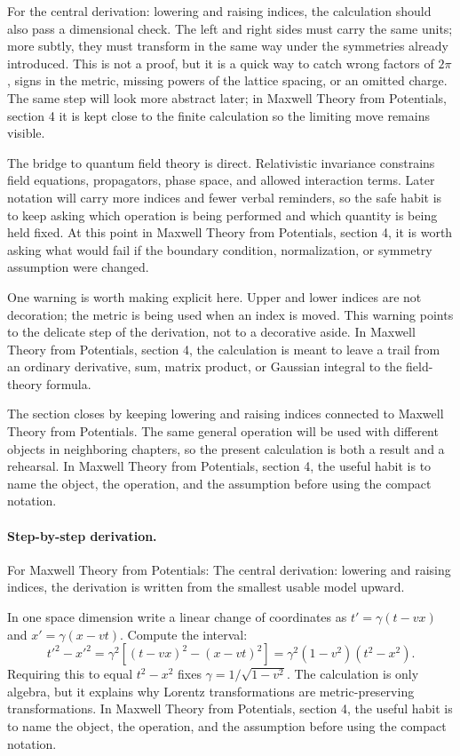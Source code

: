 For the central derivation: lowering and raising indices, the calculation should also pass a dimensional check.  The left and right sides must carry the same units; more subtly, they must transform in the same way under the symmetries already introduced.  This is not a proof, but it is a quick way to catch wrong factors of \(2\pi\), signs in the metric, missing powers of the lattice spacing, or an omitted charge.  The same step will look more abstract later; in Maxwell Theory from Potentials, section 4 it is kept close to the finite calculation so the limiting move remains visible.

The bridge to quantum field theory is direct.  Relativistic invariance constrains field equations, propagators, phase space, and allowed interaction terms.  Later notation will carry more indices and fewer verbal reminders, so the safe habit is to keep asking which operation is being performed and which quantity is being held fixed.  At this point in Maxwell Theory from Potentials, section 4, it is worth asking what would fail if the boundary condition, normalization, or symmetry assumption were changed.

One warning is worth making explicit here.  Upper and lower indices are not decoration; the metric is being used when an index is moved.  This warning points to the delicate step of the derivation, not to a decorative aside.  In Maxwell Theory from Potentials, section 4, the calculation is meant to leave a trail from an ordinary derivative, sum, matrix product, or Gaussian integral to the field-theory formula.

The section closes by keeping lowering and raising indices connected to Maxwell Theory from Potentials.  The same general operation will be used with different objects in neighboring chapters, so the present calculation is both a result and a rehearsal.  In Maxwell Theory from Potentials, section 4, the useful habit is to name the object, the operation, and the assumption before using the compact notation.



\paragraph{Step-by-step derivation.}

For Maxwell Theory from Potentials: The central derivation: lowering and raising indices, the derivation is written from the smallest usable model upward.

In one space dimension write a linear change of coordinates as \(t'=\gamma(t-vx)\) and \(x'=\gamma(x-vt)\).  Compute the interval:
\[
  t'^2-x'^2
  =
  \gamma^2[(t-vx)^2-(x-vt)^2]
  =
  \gamma^2(1-v^2)(t^2-x^2).
\]
Requiring this to equal \(t^2-x^2\) fixes \(\gamma=1/\sqrt{1-v^2}\).  The calculation is only algebra, but it explains why Lorentz transformations are metric-preserving transformations.  In Maxwell Theory from Potentials, section 4, the useful habit is to name the object, the operation, and the assumption before using the compact notation.

